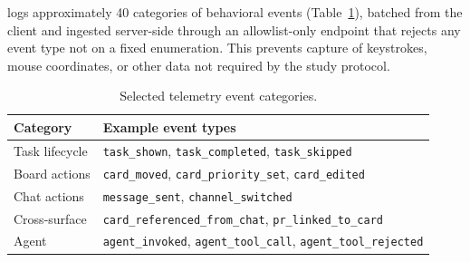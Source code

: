 \Weld logs approximately 40 categories of behavioral events
(Table~\ref{tab:events}), batched from the client and ingested server-side
through an allowlist-only endpoint that rejects any event type not on a fixed
enumeration. This prevents capture of keystrokes, mouse coordinates, or other
data not required by the study protocol.

\begin{table}[h]
  \caption{Selected telemetry event categories.}
  \label{tab:events}
  \begin{tabular}{ll}
    \toprule
    Category & Example event types \\
    \midrule
    Task lifecycle  & \texttt{task\_shown}, \texttt{task\_completed}, \texttt{task\_skipped} \\
    Board actions   & \texttt{card\_moved}, \texttt{card\_priority\_set}, \texttt{card\_edited} \\
    Chat actions    & \texttt{message\_sent}, \texttt{channel\_switched} \\
    Cross-surface   & \texttt{card\_referenced\_from\_chat}, \texttt{pr\_linked\_to\_card} \\
    Agent           & \texttt{agent\_invoked}, \texttt{agent\_tool\_call}, \texttt{agent\_tool\_rejected} \\
    \bottomrule
  \end{tabular}
\end{table}

